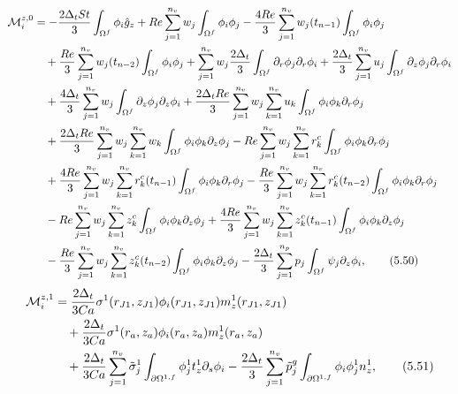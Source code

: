 \documentclass{article}
\begin{document}
\begin{align}
\mathcal{M}_i^{z,0} &= -\frac{2\Delta_t St}{3} \int_{\Omega^f} \phi_i \hat{g}_z + Re \sum_{j=1}^{n_v} w_j \int_{\Omega^f} \phi_i \phi_j - \frac{4Re}{3} \sum_{j=1}^{n_v} w_j(t_{n-1}) \int_{\Omega^f} \phi_i \phi_j \nonumber\\
&\quad + \frac{Re}{3} \sum_{j=1}^{n_v} w_j(t_{n-2}) \int_{\Omega^f} \phi_i \phi_j + \sum_{j=1}^{n_v} w_j \frac{2\Delta_t}{3} \int_{\Omega^f} \partial_r \phi_j \partial_r \phi_i + \frac{2\Delta_t}{3} \sum_{j=1}^{n_v} u_j \int_{\Omega^f} \partial_z \phi_j \partial_r \phi_i \nonumber\\
&\quad + \frac{4\Delta_t}{3} \sum_{j=1}^{n_v} w_j \int_{\Omega^f} \partial_z \phi_j \partial_z \phi_i + \frac{2\Delta_t Re}{3} \sum_{j=1}^{n_v} w_j \sum_{k=1}^{n_v} u_k \int_{\Omega^f} \phi_i \phi_k \partial_r \phi_j \nonumber\\
&\quad + \frac{2\Delta_t Re}{3} \sum_{j=1}^{n_v} w_j \sum_{k=1}^{n_v} w_k \int_{\Omega^f} \phi_i \phi_k \partial_z \phi_j - Re \sum_{j=1}^{n_v} w_j \sum_{k=1}^{n_v} r_k^c \int_{\Omega^f} \phi_i \phi_k \partial_r \phi_j \nonumber\\
&\quad + \frac{4Re}{3} \sum_{j=1}^{n_v} w_j \sum_{k=1}^{n_v} r_k^c(t_{n-1}) \int_{\Omega^f} \phi_i \phi_k \partial_r \phi_j - \frac{Re}{3} \sum_{j=1}^{n_v} w_j \sum_{k=1}^{n_v} r_k^c(t_{n-2}) \int_{\Omega^f} \phi_i \phi_k \partial_r \phi_j \nonumber\\
&\quad - Re \sum_{j=1}^{n_v} w_j \sum_{k=1}^{n_v} z_k^c \int_{\Omega^f} \phi_i \phi_k \partial_z \phi_j + \frac{4Re}{3} \sum_{j=1}^{n_v} w_j \sum_{k=1}^{n_v} z_k^c(t_{n-1}) \int_{\Omega^f} \phi_i \phi_k \partial_z \phi_j \nonumber\\
&\quad - \frac{Re}{3} \sum_{j=1}^{n_v} w_j \sum_{k=1}^{n_v} z_k^c(t_{n-2}) \int_{\Omega^f} \phi_i \phi_k \partial_z \phi_j - \frac{2\Delta_t}{3} \sum_{j=1}^{n_p} p_j \int_{\Omega^f} \psi_j \partial_z \phi_i, \tag{5.50}
\end{align}
\begin{align}
\mathcal{M}_i^{z,1} &= \frac{2\Delta_t}{3Ca} \sigma^1(r_{J1},z_{J1}) \phi_i(r_{J1},z_{J1}) m_z^{1}(r_{J1},z_{J1}) \nonumber\\
&\quad + \frac{2\Delta_t}{3Ca} \sigma^1(r_a,z_a) \phi_i(r_a,z_a) m_z^{1}(r_a,z_a) \nonumber\\
&\quad + \frac{2\Delta_t}{3Ca} \sum_{j=1}^{n_v} \tilde{\sigma}_j^1 \int_{\partial \Omega^{1,f}} \phi_j^1 t_z^1 \partial_s \phi_i - \frac{2\Delta_t}{3} \sum_{j=1}^{n_v} \tilde{p}_j^g \int_{\partial \Omega^{1,f}} \phi_i \phi_j^1 n_z^1, \tag{5.51}
\end{align}
\end{document}
